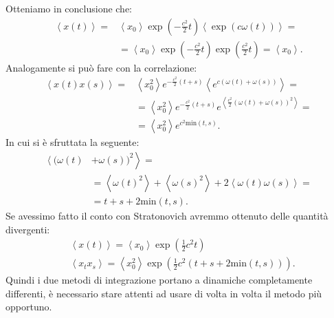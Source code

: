 \begin{exmp}[]
    Otteniamo in conclusione che:
    \[\begin{aligned}
	\left<x(t)\right>=& \left<x_0\right>\exp\left(-\frac{c^2}{2}t\right)\left<\exp\left(c\omega (t) \right)\right> = \\
			  & =\left<x_0\right>\exp\left(-\frac{c^2}{2}t\right) \exp\left(\frac{c^2}{2}t\right) = \left<x_0\right>
    .\end{aligned}\]
    Analogamente si può fare con la correlazione:
    \[\begin{aligned}
	\left<x(t) x(s)\right> = & \left<x_0^2\right>e^{-\frac{c^2}{2}\left(t+s\right)} \left<e^{c(\omega (t) + \omega (s) )}\right> = \\
				 & =\left<x_0^2\right>e^{-\frac{c^2}{2}\left(t+s\right)} e^{\left<\frac{c^2}{2}(\omega(t) +\omega(s))^2\right>} =\\
				 & = \left<x_0^2\right>e^{c^2\text{min}(t,s)}
    .\end{aligned}\]
    In cui si è sfruttata la seguente:
    \[\begin{aligned}
	\left<(\omega(t) \right.&+\left.\omega(s))^2\right> = \\
	&= \left<\omega (t)^2\right> + \left<\omega(s) ^2\right> + 2 \left<\omega (t) \omega (s)\right> = \\
	&= t + s + 2\mbox{min}(t,s) 
    .\end{aligned}\]
    Se avessimo fatto il conto con Stratonovich avremmo ottenuto delle quantità divergenti:
    \[\begin{aligned}
	&\left<x(t) \right> = \left<x_0\right>\exp\left(\frac{1}{2}c^2t\right)\\
	&\left<x_tx_s\right> = \left<x_0^2\right>\exp\left(\frac{1}{2}c^2\left(t+s+2\text{min}(t,s) \right)\right)
    .\end{aligned}\]
    Quindi i due metodi di integrazione portano a dinamiche completamente differenti, è necessario stare attenti ad usare di volta in volta il metodo più opportuno.
\end{exmp}

